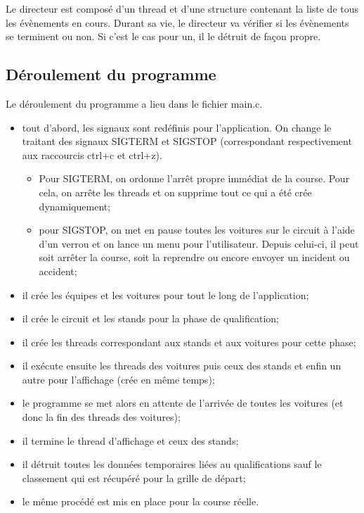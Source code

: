 \documentclass[a4paper, 11pt]{report}
\begin{document}
			 Le directeur est composé d'un thread et d'une structure contenant la liste de tous les évènements en cours. Durant sa vie, le directeur va vérifier si les évènements se terminent ou non. Si c'est le cas pour un, il le détruit de façon propre.
			
			
			
			\subsection{Déroulement du programme}
			
			Le déroulement du programme a lieu dans le fichier main.c. 
			\begin{itemize}
				\item tout d'abord, les signaux sont redéfinis pour l'application. On change le traitant des signaux SIGTERM et SIGSTOP (correspondant respectivement aux raccourcis ctrl+c et ctrl+z).
				\begin{itemize}
				\item Pour SIGTERM, on ordonne l'arrêt propre immédiat de la course. Pour cela, on arrête les threads et on supprime tout ce qui a été crée dynamiquement;
				\item pour SIGSTOP, on met en pause toutes les voitures sur le circuit à l'aide d'un verrou et on lance un menu pour l'utilisateur. Depuis celui-ci, il peut soit arrêter la course, soit la reprendre ou encore envoyer un incident ou accident;
\end{itemize}				  
				\item il crée les équipes et les voitures pour tout le long de l'application;
				\item il crée le circuit et les stands pour la phase de qualification;
				\item il crée les threads correspondant aux stands et aux voitures pour cette phase;
				\item il exécute ensuite les threads des voitures puis ceux des stands et enfin un autre pour l'affichage (crée en même temps);
				\item le programme se met alors en attente de l'arrivée de toutes les voitures (et donc la fin des threads des voitures);
				\item il termine le thread d'affichage et ceux des stands;
				\item il détruit toutes les données temporaires liées au qualifications sauf le classement qui est récupéré pour la grille de départ;
				\item le même procédé est mis en place pour la course réelle.
			\end{itemize}
			
\end{document}
